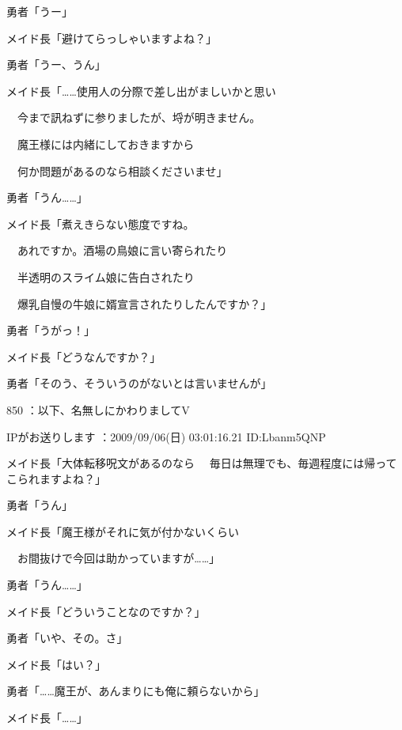 \documentclass[a4j,twocolumn]{tarticle}
\begin{document}
勇者「うー」 



メイド長「避けてらっしゃいますよね？」\par{} 
勇者「うー、うん」 



メイド長「……使用人の分際で差し出がましいかと思い\par{} 
　今まで訊ねずに参りましたが、埒が明きません。\par{} 
　魔王様には内緒にしておきますから\par{} 
　何か問題があるのなら相談くださいませ」 



勇者「うん……」 



メイド長「煮えきらない態度ですね。\par{} 
　あれですか。酒場の鳥娘に言い寄られたり\par{} 
　半透明のスライム娘に告白されたり\par{} 
　爆乳自慢の牛娘に婿宣言されたりしたんですか？」 



勇者「うがっ！」 



メイド長「どうなんですか？」 



勇者「そのう、そういうのがないとは言いませんが」 

	
    
    

850 ：以下、名無しにかわりましてV\par{} IPがお送りします ：2009/09/06(日) 03:01:16.21 ID:Lbanm5QNP 


メイド長「大体転移呪文があるのなら 
　毎日は無理でも、毎週程度には帰ってこられますよね？」 



勇者「うん」 



メイド長「魔王様がそれに気が付かないくらい\par{}  
　お間抜けで今回は助かっていますが……」 



勇者「うん……」 \par{} 
メイド長「どういうことなのですか？」 



勇者「いや、その。さ」\par{}  
メイド長「はい？」 



勇者「……魔王が、あんまりにも俺に頼らないから」\par{}  
メイド長「……」 
\end{document}
